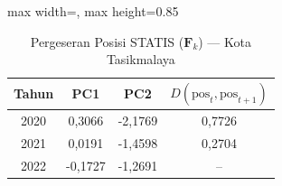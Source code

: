 \begin{table}[H]
\centering
\caption{Pergeseran Posisi STATIS ($\mathbf{F}_k$) --- Kota Tasikmalaya} \label{tab:sample2jarak_statis_skor_kota_tasikmalaya}
\begin{adjustbox}{max width=\textwidth, max height=0.85\textheight}
\begin{tabular}{|c|c|c|c|}
\hline
\textbf{Tahun} & \textbf{PC1} & \textbf{PC2} & \textbf{$D(\text{pos}_t, \text{pos}_{t+1})$} \\
\hline
2020 & 0,3066 & -2,1769 & 0,7726 \\
2021 & 0,0191 & -1,4598 & 0,2704 \\
2022 & -0,1727 & -1,2691 & -- \\
\hline
\end{tabular}
\end{adjustbox}
\end{table}